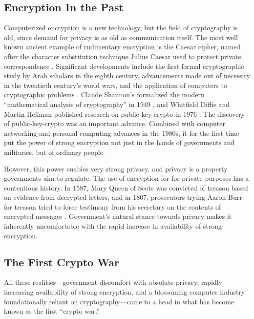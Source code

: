 \subsection{Encryption In the Past}
\label{sec-history-old}

Computerized encryption is a new technology, but the field of cryptography is old, since demand for privacy is as old as
communication itself. The most well known ancient example of rudimentary encryption is the Caesar cipher, named after
the character substitution technique Julius Caesar used to protect private correspondence
\cite{luciano_cryptology_1987}. Significant developments include the first formal cryptographic study by Arab scholars
in the eighth century, advancements made out of necessity in the twentieth century's world wars, and the application of
computers to cryptographic problems \cite{kahn_codebreakers_1996}. Claude Shannon's formalized the modern ``mathematical
analysis of cryptography'' in 1949 \cite{shannon_communication_1949}, and Whitfield Diffie and Martin Hellman published
research on \ac{public-key-crypto} in 1976 \cite{diffie_new_1976}. The discovery of \ac{public-key-crypto} was an
important advance. Combined with computer networking and personal computing advances in the 1980s, it for the first time
put the power of strong encryption not just in the hands of governments and militaries, but of ordinary people.

However, this power enables very strong privacy, and privacy is a property governments aim to regulate. The use of
encryption for for private purposes has a contentious history. In 1587, Mary Queen of Scots was convicted of treason
based on evidence from decrypted letters, and in 1807, prosecutors trying Aaron Burr for treason tried to force
testimony from his secretary on the contents of encrypted messages \cite{kerr_encryption_2017}. Government's natural
stance towards privacy makes it inherently uncomfortable with the rapid increase in availability of strong encryption.


\subsection{The First Crypto War}
\label{sec-history-cw1}

All these realities---government discomfort with absolute privacy, rapidly increasing availability of strong encryption,
and a blossoming computer industry foundationally reliant on cryptography---came to a head in what has become known as
the first ``crypto war.''

